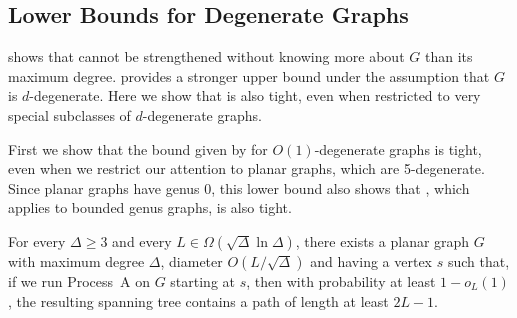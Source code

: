 \documentclass{patmorin}
\begin{document}
\subsection{Lower Bounds for Degenerate Graphs}

 shows that 
cannot be strengthened without knowing more about $G$ than its maximum
degree.   provides a stronger
upper bound under the assumption that $G$ is $d$-degenerate.  Here we
show that  is also tight, even
when restricted to very special subclasses of $d$-degenerate graphs.

First we show that the bound given by
 for $O(1)$-degenerate graphs
is tight, even when we restrict our attention to planar graphs, which
are 5-degenerate.  Since planar graphs have genus 0, this lower bound
also shows that , which applies to
bounded genus graphs, is also tight.

\begin{thm}
  For every $\Delta\ge 3$ and every $L\in\Omega(\sqrt{\Delta}\ln\Delta)$,
  there exists a planar graph $G$ with maximum degree $\Delta$, diameter
  $O(L/\sqrt{\Delta})$ and having a vertex $s$ such that, if we run
  Process~A on $G$ starting at $s$, then with probability at least
  $1-o_L(1)$, the resulting spanning tree contains a path of length at
  least $2L-1$.
\end{thm}
\end{document}
